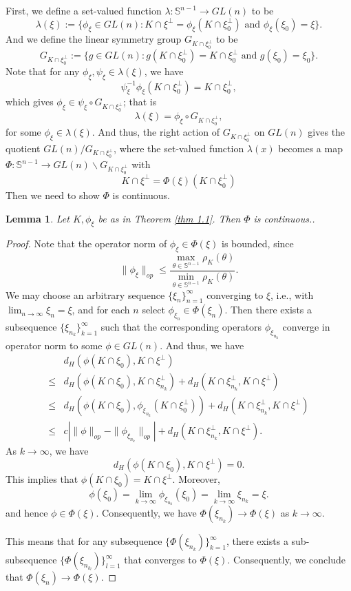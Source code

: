 \documentclass[amsfonts,reqno,11pt]{amsart}
\newtheorem{lem}{Lemma}[section]
\newcommand{\sphere}{\mathbb{S}^{n-1}}
\begin{document}
First, we define a set-valued function $\lambda:\sphere\to GL(n)$ to be
$$
\lambda(\xi):=\{\phi_{\xi}\in GL(n): K\cap \xi^\perp=\phi_{\xi}(K\cap\xi_0^\perp)\mbox{ and }\phi_\xi(\xi_0)=\xi\}.
$$
And we define the linear symmetry group $G_{K\cap\xi_0^\perp}$ to be
$$
G_{K\cap\xi_0^\perp}:=\{g\in GL(n): g(K\cap\xi_0^\perp)=K\cap \xi_0^\perp \mbox{ and } g(\xi_0)=\xi_0\}.
$$
Note that for any $\phi_\xi, \psi_\xi\in \lambda(\xi)$, we have 
$$
\psi_\xi^{-1}\phi_\xi(K\cap\xi_0^\perp)=K\cap\xi_0^\perp,
$$
which gives $\phi_\xi\in \psi_\xi \circ G_{K\cap\xi_0^\perp}$; that is
$$
\lambda(\xi)=\phi_\xi\circ G_{K\cap\xi_0^\perp},
$$
for some $\phi_\xi\in \lambda(\xi)$. And thus, the right action of $G_{K\cap\xi_0^\perp}$ on $GL(n)$ gives the quotient $GL(n)/G_{K\cap\xi_0^\perp}$, where the set-valued function $\lambda(x)$ becomes a map $\Phi: \sphere \to GL(n)\backslash G_{K\cap\xi_0^\perp}$ with
$$
K\cap \xi^\perp=\Phi(\xi)(K\cap\xi_0^\perp)
$$
Then we need to show $\Phi$ is continuous.
\begin{lem}\label{lem 3.2}
     Let $K, \phi_\xi$ be as in Theorem \ref{thm 1.1}. Then $\Phi$ is continuous..
\end{lem}
\begin{proof}
Note that the operator norm of $\phi_\xi\in \Phi(\xi)$ is bounded, since 
$$
\|\phi_\xi\|_{op}\leq \frac{\max_{\theta\in \sphere}\rho_K(\theta)}{\min_{\theta\in \sphere}\rho_K(\theta)}.
$$
We may choose an arbitrary sequence $\{\xi_n\}_{n=1}^\infty$ converging to $\xi$, i.e., with $\lim_{n\to\infty}\xi_n=\xi$, and for each $n$ select $\phi_{\xi_n}\in \Phi(\xi_n)$. Then there exists a subsequence $\{\xi_{n_k}\}_{k=1}^\infty$ such that the corresponding operators $\phi_{\xi_{n_k}}$ converge in operator norm to some $\phi\in GL(n)$. And thus, we have
\begin{align*}
    & d_{H}(\phi(K\cap \xi_0),K\cap\xi^\perp)\\
     \leq & d_{H}(\phi(K\cap \xi_0), K\cap\xi_{n_k}^\perp)+d_H(K\cap\xi_{n_k}^\perp, K\cap\xi^\perp)\\
    \leq & d_{H}(\phi(K\cap \xi_0), \phi_{\xi_{n_k}}(K\cap\xi_0^\perp))+d_H(K\cap\xi_{n_k}^\perp, K\cap\xi^\perp)\\
    \leq & c \left|\|\phi\|_{op}-\|\phi_{\xi_{n_k}}\|_{op}\right|+d_H(K\cap\xi_{n_k}^\perp, K\cap\xi^\perp).
\end{align*}
As $k\to \infty$, we have
$$
d_{H}(\phi(K\cap \xi_0),K\cap\xi^\perp)=0.
$$
This implies that $\phi(K\cap \xi_0)=K\cap\xi^\perp$. Moreover,
$$
\phi(\xi_0)=\lim_{k\to\infty}\phi_{\xi_{n_k}}(\xi_0)=\lim_{k\to\infty}\xi_{n_k}=\xi.
$$
and hence $\phi\in \Phi(\xi)$. Consequently, we have $\Phi(\xi_{n_k})\to \Phi(\xi)$ as $k\to \infty$.

This means that for any subsequence $\{\Phi(\xi_{n_k})\}_{k=1}^\infty$, there exists a sub-subsequence $\{\Phi(\xi_{n_{k_l}})\}_{l=1}^\infty$ that converges to $\Phi(\xi)$. Consequently, we conclude that $\Phi(\xi_n) \to \Phi(\xi)$.
\end{proof}
\end{document}
